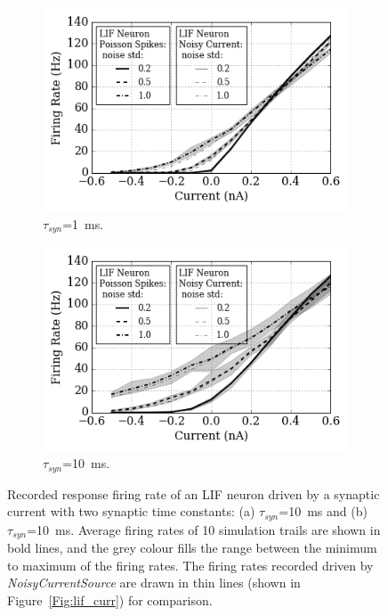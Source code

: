 	\begin{figure}[tbp!]
		\centering
		\begin{subfigure}[t]{0.49\textwidth}
			\includegraphics[width=\textwidth]{pics_iconip/spiked_curve_1.png}
			\caption{$\tau_{syn}$=1~ms.}
		\end{subfigure}
		\begin{subfigure}[t]{0.49\textwidth}
			\includegraphics[width=\textwidth]{pics_iconip/spiked_curve_10.png}
			\caption{$\tau_{syn}$=10~ms.}
		\end{subfigure}
		\caption{Recorded response firing rate of an LIF neuron driven by a synaptic current with two synaptic time constants: (a) $\tau_{syn}$=10~ms and (b) $\tau_{syn}$=10~ms. Average firing rates of 10 simulation trails are shown in bold lines, and the grey colour fills the range between the minimum to maximum of the firing rates. The firing rates recorded driven by \textit{NoisyCurrentSource} are drawn in thin lines (shown in Figure~\ref{Fig:lif_curr}) for comparison.}
		\label{Fig:spike_curr}
	\end{figure}
	

